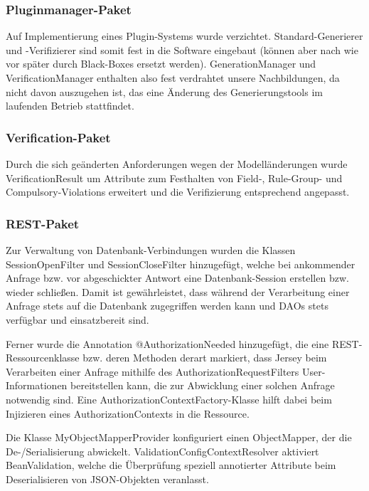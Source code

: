 \subsubsection{Pluginmanager-Paket}

Auf Implementierung eines Plugin-Systems wurde verzichtet.
Standard-Generierer und -Verifizierer sind somit fest in die Software eingebaut (können aber nach wie vor später durch Black-Boxes ersetzt werden). GenerationManager und VerificationManager enthalten also fest verdrahtet unsere Nachbildungen, da nicht davon auszugehen ist, das eine Änderung des Generierungstools im laufenden Betrieb stattfindet.


\subsubsection{Verification-Paket}

Durch die sich geänderten Anforderungen wegen der Modelländerungen wurde VerificationResult um Attribute zum Festhalten von Field-, Rule-Group- und Compulsory-Violations erweitert und die Verifizierung entsprechend angepasst.


\subsubsection{REST-Paket}

Zur Verwaltung von Datenbank-Verbindungen wurden die Klassen SessionOpenFilter und SessionCloseFilter hinzugefügt, welche bei ankommender Anfrage bzw. vor abgeschickter Antwort eine Datenbank-Session erstellen bzw. wieder schließen. Damit ist gewährleistet, dass während der Verarbeitung einer Anfrage stets auf die Datenbank zugegriffen werden kann und DAOs stets verfügbar und einsatzbereit sind.

Ferner wurde die Annotation @AuthorizationNeeded hinzugefügt, die eine REST-Ressourcenklasse bzw. deren Methoden derart markiert, dass Jersey beim Verarbeiten einer Anfrage mithilfe des AuthorizationRequestFilters User-Informationen bereitstellen kann, die zur Abwicklung einer solchen Anfrage notwendig sind. Eine AuthorizationContextFactory-Klasse hilft dabei beim Injizieren eines AuthorizationContexts in die Ressource.

Die Klasse MyObjectMapperProvider konfiguriert einen ObjectMapper, der die De-/Serialisierung abwickelt. ValidationConfigContextResolver aktiviert BeanValidation, welche die Überprüfung speziell annotierter Attribute beim Deserialisieren von JSON-Objekten veranlasst.



